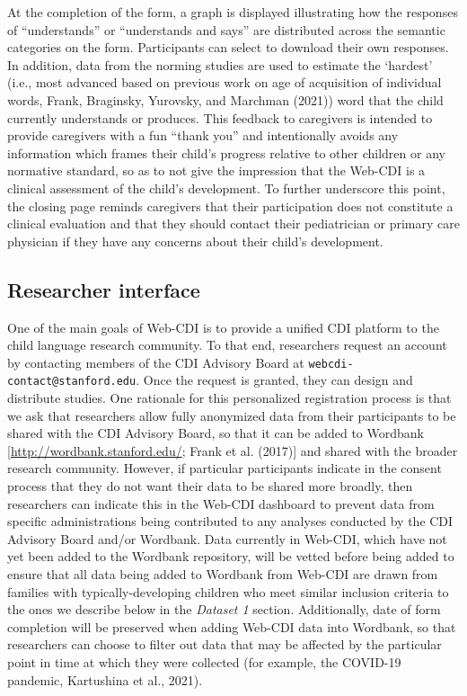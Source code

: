\documentclass[
  english,
  ,man,floatsintext]{apa6}
\begin{document}
At the completion of the form, a graph is displayed illustrating how the responses of ``understands'' or ``understands and says'' are distributed across the semantic categories on the form. Participants can select to download their own responses. In addition, data from the norming studies are used to estimate the `hardest' (i.e., most advanced based on previous work on age of acquisition of individual words, Frank, Braginsky, Yurovsky, and Marchman (2021)) word that the child currently understands or produces. This feedback to caregivers is intended to provide caregivers with a fun ``thank you'' and intentionally avoids any information which frames their child's progress relative to other children or any normative standard, so as to not give the impression that the Web-CDI is a clinical assessment of the child's development. To further underscore this point, the closing page reminds caregivers that their participation does not constitute a clinical evaluation and that they should contact their pediatrician or primary care physician if they have any concerns about their child's development.

\hypertarget{researcher-interface}{%
\subsection{Researcher interface}\label{researcher-interface}}

One of the main goals of Web-CDI is to provide a unified CDI platform to the child language research community. To that end, researchers request an account by contacting members of the CDI Advisory Board at \texttt{webcdi-contact@stanford.edu}. Once the request is granted, they can design and distribute studies. One rationale for this personalized registration process is that we ask that researchers allow fully anonymized data from their participants to be shared with the CDI Advisory Board, so that it can be added to Wordbank {[}\url{http://wordbank.stanford.edu/}; Frank et al. (2017){]} and shared with the broader research community. However, if particular participants indicate in the consent process that they do not want their data to be shared more broadly, then researchers can indicate this in the Web-CDI dashboard to prevent data from specific administrations being contributed to any analyses conducted by the CDI Advisory Board and/or Wordbank. Data currently in Web-CDI, which have not yet been added to the Wordbank repository, will be vetted before being added to ensure that all data being added to Wordbank from Web-CDI are drawn from families with typically-developing children who meet similar inclusion criteria to the ones we describe below in the \emph{Dataset 1} section. Additionally, date of form completion will be preserved when adding Web-CDI data into Wordbank, so that researchers can choose to filter out data that may be affected by the particular point in time at which they were collected (for example, the COVID-19 pandemic, Kartushina et al., 2021).
\end{document}
